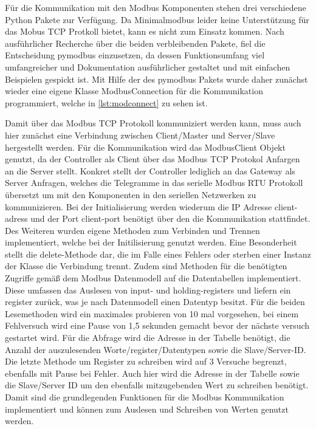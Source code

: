 

Für die Kommunikation mit den Modbus Komponenten stehen drei verschiedene Python Pakete zur Verfügung. Da Minimalmodbus leider keine Unterstützung für das Mobus TCP Protkoll bietet, kann es nicht zum Einsatz kommen. Nach ausführlicher Recherche über die beiden verbleibenden Pakete, fiel die Entscheidung pymodbus einzusetzen, da dessen Funktionsumfang viel umfangreicher und Dokumentation ausführlicher gestaltet und mit einfachen Beispielen gespickt ist.
Mit Hilfe der des pymodbus Pakets wurde daher zunächst wieder eine eigene Klasse ModbusConnection für die Kommunikation programmiert, welche in \ref{lst:modconnect} zu sehen ist.

Damit über das Modbus TCP Protokoll kommuniziert werden kann, muss auch hier zunächst eine Verbindung zwischen Client/Master und Server/Slave hergestellt werden. Für die Kommunikation wird das ModbusClient Objekt genutzt, da der Controller als Client über das Modbus TCP Protokol Anfargen an die Server stellt. Konkret stellt der Controller lediglich an das Gateway als Server Anfragen, welches die Telegramme in das serielle Modbus RTU Protokoll übersetzt um mit den Komponenten in den seriellen Netzwerken zu kommunizieren. Bei der Initialisierung werden wiederum die IP Adresse client-adress und der Port client-port benötigt über den die Kommunikation stattfindet. Des Weiteren wurden eigene Methoden zum Verbinden und Trennen implementiert, welche bei der Initilisierung genutzt werden. Eine Besonderheit stellt die delete-Methode dar, die im Falle eines Fehlers oder sterben einer Instanz der Klasse die Verbindung trennt. 
Zudem sind Methoden für die benötigten Zugriffe gemäß dem Modbus Datenmodell auf die Datentabellen implementiert. Diese umfassen das Auslesen von input- und holding-registers und liefern ein register zurück, was je nach Datenmodell einen Datentyp besitzt. Für die beiden Lesemethoden wird ein maximales probieren von 10 mal vorgesehen, bei einem Fehlversuch wird eine Pause von 1,5 sekunden gemacht bevor der nächste versuch gestartet wird. Für die Abfrage wird die Adresse in der Tabelle benötigt, die Anzahl der auszulesenden Worte/register/Datentypen sowie die Slave/Server-ID. Die letzte Methode um Register zu schreiben wird auf 3 Versuche begrenzt, ebenfalls mit Pause bei Fehler. Auch hier wird die Adresse in der Tabelle sowie die Slave/Server ID um den ebenfalls mitzugebenden Wert zu schreiben benötigt.
Damit sind die grundlegenden Funktionen für die Modbus Kommunikation implementiert und können zum Auslesen und Schreiben von Werten genutzt werden.


